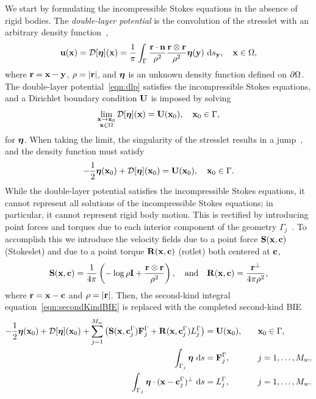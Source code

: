 \documentclass[preprint, 10pt]{elsarticle}
\begin{document}
We start by formulating the incompressible Stokes equations in the
absence of rigid bodies.  The {\em double-layer potential} is the
convolution of the stresslet with an arbitrary density
function~\cite{Ladyzhenskaya1963, Pozrikidis1992},
\begin{align}
  \label{eqn:dlp}
  {\mathbf{u}}({\mathbf{x}}) = {\mathcal{D}}[{\boldsymbol\eta}]({\mathbf{x}}) = \frac{1}{\pi}\int_{\Gamma}
  \frac{{\mathbf{r}}\cdot{\mathbf{n}}}{\rho^2}\frac{{\mathbf{r}} \otimes {\mathbf{r}}}{\rho^2}
  {\boldsymbol\eta}({\mathbf{y}})~\text{d}s_{{\mathbf{y}}}, \quad {\mathbf{x}} \in \Omega,
\end{align}
where ${\mathbf{r}} = {\mathbf{x}} - {\mathbf{y}}$, $\rho=|{\mathbf{r}}|$, and ${\boldsymbol\eta}$ is an unknown density
function defined on ${\partial}\Omega$.  The double-layer
potential~\eqref{eqn:dlp} satisfies the incompressible Stokes equations,
and a Dirichlet boundary condition ${\mathbf{U}}$ is imposed by solving
\begin{align*}
  \lim_{\substack{{\mathbf{x}} \rightarrow {\mathbf{x}}_0 \\ {\mathbf{x}} \in \Omega}}
    {\mathcal{D}}[{\boldsymbol\eta}]({\mathbf{x}}) = {\mathbf{U}}({\mathbf{x}}_0), \quad {\mathbf{x}}_0 \in \Gamma,
\end{align*}
for ${\boldsymbol\eta}$.  When taking the limit, the
singularity of the stresslet results in a jump~\cite{Pozrikidis1992},
and the density function must satisfy  
\begin{align}
  -\frac{1}{2} {\boldsymbol\eta}({\mathbf{x}}_0) + {\mathcal{D}}[{\boldsymbol\eta}]({\mathbf{x}}_0) = {\mathbf{U}}({\mathbf{x}}_0), 
    \quad {\mathbf{x}}_0 \in \Gamma.
  \label{eqn:secondKindBIE}
\end{align}
While the double-layer potential satisfies the incompressible Stokes
equations, it cannot represent all solutions of the incompressible
Stokes equations; in particular, it cannot represent rigid body motion.
This is rectified by introducing point forces and torques due to each
interior component of the geometry $\Gamma_j$~\cite{Power1987,
Power1993}.  To accomplish this we introduce the velocity fields due to a
point force $\mathbf{S}({\mathbf{x}},{\mathbf{c}})$ (Stokeslet) and due to a 
point torque $\mathbf{R}({\mathbf{x}},{\mathbf{c}})$ (rotlet) both centered at ${\mathbf{c}}$,
\begin{align*}
  \mathbf{S}({\mathbf{x}},{\mathbf{c}}) = \frac{1}{4\pi}\left(-\log\rho\mathbf{I} + 
  \frac{{\mathbf{r}} \otimes {\mathbf{r}}}{\rho^2}\right), \quad \text{and} \quad
  \mathbf{R}({\mathbf{x}},{\mathbf{c}}) = \frac{{\mathbf{r}}^\perp}{4\pi\rho^2},
\end{align*}
where ${\mathbf{r}} = {\mathbf{x}} - {\mathbf{c}}$ and $\rho = |{\mathbf{r}}|$.  Then, the second-kind
integral equation~\eqref{eqn:secondKindBIE} is replaced with the
completed second-kind BIE
\begin{equation}
  \label{eqn:completed_DLP}
  \begin{split}
  -\frac{1}{2}{\boldsymbol\eta}({\mathbf{x}}_0) + {\mathcal{D}}[{\boldsymbol\eta}]({\mathbf{x}}_0) + 
    \sum_{j=1}^{M_w} \left(\mathbf{S}({\mathbf{x}},{\mathbf{c}}^\Gamma_j){\mathbf{F}}^\Gamma_j + 
      \mathbf{R}({\mathbf{x}},{\mathbf{c}}^\Gamma_j)L^\Gamma_j\right) &= {\mathbf{U}}({\mathbf{x}}_0),
      \quad &&{\mathbf{x}}_0 \in \Gamma, \\
  \int_{\Gamma_j} {\boldsymbol\eta}~\text{d}s &= {\mathbf{F}}^\Gamma_j, 
      &&j=1,\ldots,M_w, \\
  \int_{\Gamma_j} {\boldsymbol\eta}\cdot ({\mathbf{x}} - {\mathbf{c}}^\Gamma_j)^\perp~\text{d}s &=   
      L^\Gamma_j, &&j=1,\ldots,M_w.
  \end{split}
\end{equation}
\end{document}
